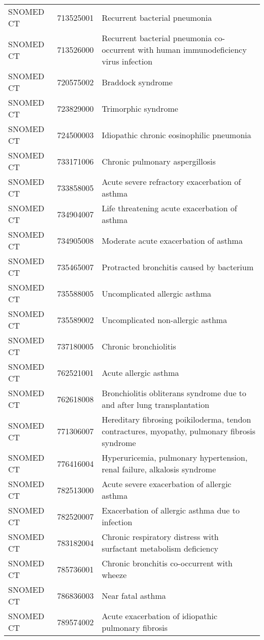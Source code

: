 \begin{table}[ht]
\begin{tabular}{lll}
  SNOMED CT & 713525001 & Recurrent bacterial pneumonia \\ 
  SNOMED CT & 713526000 & Recurrent bacterial pneumonia co-occurrent with human immunodeficiency virus infection \\ 
  SNOMED CT & 720575002 & Braddock syndrome \\ 
  SNOMED CT & 723829000 & Trimorphic syndrome \\ 
  SNOMED CT & 724500003 & Idiopathic chronic eosinophilic pneumonia \\ 
  SNOMED CT & 733171006 & Chronic pulmonary aspergillosis \\ 
  SNOMED CT & 733858005 & Acute severe refractory exacerbation of asthma \\ 
  SNOMED CT & 734904007 & Life threatening acute exacerbation of asthma \\ 
  SNOMED CT & 734905008 & Moderate acute exacerbation of asthma \\ 
  SNOMED CT & 735465007 & Protracted bronchitis caused by bacterium \\ 
  SNOMED CT & 735588005 & Uncomplicated allergic asthma \\ 
  SNOMED CT & 735589002 & Uncomplicated non-allergic asthma \\ 
  SNOMED CT & 737180005 & Chronic bronchiolitis \\ 
  SNOMED CT & 762521001 & Acute allergic asthma \\ 
  SNOMED CT & 762618008 & Bronchiolitis obliterans syndrome due to and after lung transplantation \\ 
  SNOMED CT & 771306007 & Hereditary fibrosing poikiloderma, tendon contractures, myopathy, pulmonary fibrosis syndrome \\ 
  SNOMED CT & 776416004 & Hyperuricemia, pulmonary hypertension, renal failure, alkalosis syndrome \\ 
  SNOMED CT & 782513000 & Acute severe exacerbation of allergic asthma \\ 
  SNOMED CT & 782520007 & Exacerbation of allergic asthma due to infection \\ 
  SNOMED CT & 783182004 & Chronic respiratory distress with surfactant metabolism deficiency \\ 
  SNOMED CT & 785736001 & Chronic bronchitis co-occurrent with wheeze \\ 
  SNOMED CT & 786836003 & Near fatal asthma \\ 
  SNOMED CT & 789574002 & Acute exacerbation of idiopathic pulmonary fibrosis \\ 

\end{tabular}
\end{table}
